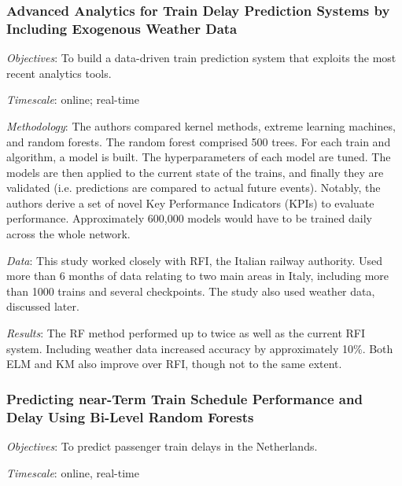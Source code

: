 \documentclass{article}
\begin{document}
\subsubsection{Advanced Analytics for Train Delay Prediction Systems by Including Exogenous Weather Data \cite{oneto_et_al_2016}}

\textit{Objectives}: To build a data-driven train prediction system that exploits the most recent analytics tools.

\smallskip

\textit{Timescale}: online; real-time

\smallskip

\textit{Methodology}: The authors compared kernel methods, extreme learning machines, and random forests. The random forest comprised 500 trees. For each train and algorithm, a model is built. The hyperparameters of each model are tuned. The models are then applied to the current state of the trains, and finally they are validated (i.e. predictions are compared to actual future events). Notably, the authors derive a set of novel Key Performance Indicators (KPIs) to evaluate performance. Approximately 600,000 models would have to be trained daily across the whole network.

\smallskip

\textit{Data}: This study worked closely with RFI, the Italian railway authority. Used more than 6 months of data relating to two main areas in Italy, including more than 1000 trains and several checkpoints. The study also used weather data, discussed later. 

\smallskip

\textit{Results}: The RF method performed up to twice as well as the current RFI system. Including weather data increased accuracy by approximately 10\%. Both ELM and KM also improve over RFI, though not to the same extent. 

\subsubsection{Predicting near-Term Train Schedule Performance and Delay Using Bi-Level Random Forests \cite{nabian_et_al_2019}}

\textit{Objectives}: To predict passenger train delays in the Netherlands.

\smallskip

\textit{Timescale}: online, real-time

\smallskip
\end{document}
